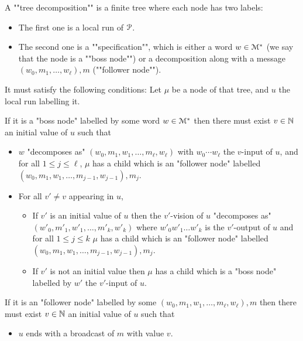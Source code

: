 \begin{definition}
	A ""tree decomposition""  is
	a finite tree where each node has two labels:
	\begin{itemize}
		\item The first one is a local run of $\mathcal{P}$. 
		
		\item The second one is a ""specification"", which is either a word $w \in \mathcal{M}^*$ (we say that the node is a ""boss node"") or a decomposition along with a message $(w_0, m_1, \ldots, w_\ell), m$ (""follower node""). 
	\end{itemize} 
	
	It must satisfy the following conditions:
	Let $\mu$ be a node of that tree, and $u$ the local run labelling it.
	
	If it is a "boss node" labelled by some word $w \in \mathcal{M}^*$ then there must exist $v \in \mathbb{N}$ an initial value of $u$ such that
	\begin{itemize}
		\item $w$ "decomposes as" $(w_0, m_1, w_1, \ldots, m_\ell, w_\ell)$ with $w_0 \cdots w_\ell$ the $v$-input of $u$, and for all $1 \leq j \leq \ell$, $\mu$ has a child which is an "follower node" labelled $(w_0, m_1, w_1, \ldots, m_{j-1}, w_{j-1}), m_j$.
		
		\item For all $v' \neq v$ appearing in $u$,
		\begin{itemize}
			\item If $v'$ is an initial value of $u$ then the $v'$-vision of $u$ "decomposes as"  $(w'_0, m'_1, w'_1, \ldots, m'_k, w'_k)$ where $w'_0 w'_1 \ldots w'_k$ is the $v'$-output of $u$ and for all $1 \leq j \leq k$ $\mu$ has a child which is an "follower node" labelled $(w_0, m_1, w_1, \ldots, m_{j-1}, w_{j-1}), m_j$.  
			
			\item If $v'$ is not an initial value then $\mu$ has a child which is a "boss node" labelled by $w'$ the $v'$-input of $u$.
		\end{itemize}
	\end{itemize}
	
	If it is an "follower node" labelled by some $(w_0, m_1, w_1, \ldots, m_\ell, w_\ell), m$ then there must exist $v \in \mathbb{N}$ an initial value of $u$ such that
	\begin{itemize}
		\item $u$ ends with a broadcast of $m$ with value $v$.
		

\end{itemize}
\end{definition}
